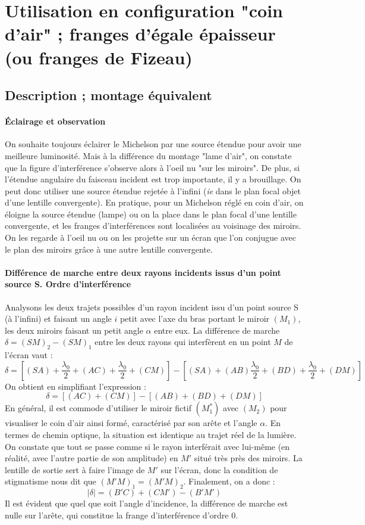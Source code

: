 \documentclass[french]{book}
\theoremstyle{plain}
\theoremstyle{definition}
\theoremstyle{remark}
\newcommand{\st}{^*}
\begin{document}
\section{Utilisation en configuration "coin d'air" ; franges d'égale épaisseur (ou franges de Fizeau)}
\subsection{Description ; montage équivalent}
\paragraph{Éclairage et observation}
On souhaite toujours éclairer le Michelson par une source étendue pour avoir une meilleure luminosité. Mais à la différence du montage "lame d'air", on constate que la figure d'interférence s'observe alors à l'oeil nu "sur les miroirs". De plus, si l'étendue angulaire du faisceau incident est trop importante, il y a brouillage. On peut donc utiliser une source étendue rejetée à l'infini (\textit{ie} dans le plan focal objet d'une lentille convergente). En pratique, pour un Michelson réglé en coin d'air, on éloigne la source étendue (lampe) ou on la place dans le plan focal d'une lentille convergente, et les franges d'interférences sont localisées au voisinage des miroirs. On les regarde à l'oeil nu ou on les projette sur un écran que l'on conjugue avec le plan des miroirs grâce à une autre lentille convergente.
\paragraph{Différence de marche entre deux rayons incidents issus d'un point source S. Ordre d'interférence} Analysons les deux trajets possibles d'un rayon incident issu d'un point source S (à l'infini) et faisant un angle $i$ petit avec l'axe du bras portant le miroir $(M_1)$, les deux miroirs faisant un petit angle $\alpha$ entre eux. La différence de marche $\delta=(SM)_2-(SM)_1$ entre les deux rayons qui interfèrent en un point $M$ de l'écran vaut : $$\delta=\left[(SA)+\frac{\lambda_0}{2}+(AC)+\frac{\lambda_0}{2}+(CM)\right]-\left[(SA)+(AB)\frac{\lambda_0}{2}+(BD)+\frac{\lambda_0}{2}+(DM)\right]$$ On obtient en simplifiant l'expression : $$\delta=\left[(AC)+(CM)\right]-\left[(AB)+(BD)+(DM)\right]$$ En général, il est commode d'utiliser le miroir fictif $(M_1\st)$ avec $(M_2)$ pour visualiser le coin d'air ainsi formé, caractérisé par son arête et l'angle $\alpha$. En termes de chemin optique, la situation est identique au trajet réel de la lumière. On constate que tout se passe comme si le rayon interférait avec lui-même (en réalité, avec l'autre partie de son amplitude) en $M'$ situé très près des miroirs. La lentille de sortie sert à faire l'image de $M'$ sur l'écran, donc la condition de stigmatisme nous dit que $(M'M)_1=(M'M)_2$. Finalement, on a donc : $$\lvert\delta\rvert=(B'C)+(CM')-(B'M')$$ Il est évident que quel que soit l'angle d'incidence, la différence de marche est nulle sur l'arête, qui constitue la frange d'interférence d'ordre 0.
\end{document}
